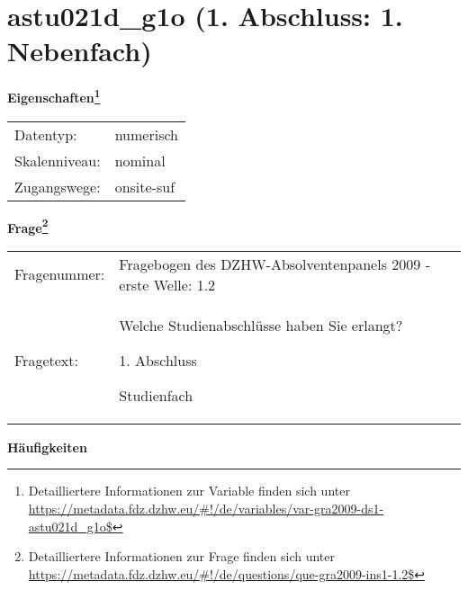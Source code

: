 
    \setcounter{footnote}{0}

    \vspace*{-1.8cm}
	\section{astu021d\_g1o (1. Abschluss: 1. Nebenfach)}
	\label{section:astu021d_g1o}



    \vspace*{0.5cm}
    \noindent\textbf{Eigenschaften\footnote{Detailliertere Informationen zur Variable finden sich unter
		\url{https://metadata.fdz.dzhw.eu/\#!/de/variables/var-gra2009-ds1-astu021d_g1o$}}}\\
	\begin{tabularx}{\hsize}{@{}lX}
	Datentyp: & numerisch \\
	Skalenniveau: & nominal \\
	Zugangswege: &
	  onsite-suf
 \\
    \end{tabularx}



				\vspace*{0.5cm}
                \noindent\textbf{Frage\footnote{Detailliertere Informationen zur Frage finden sich unter
		              \url{https://metadata.fdz.dzhw.eu/\#!/de/questions/que-gra2009-ins1-1.2$}}}\\
				\begin{tabularx}{\hsize}{@{}lX}
					Fragenummer: &
					  Fragebogen des DZHW-Absolventenpanels 2009 - erste Welle:
					  1.2
 \\
					Fragetext: & Welche Studienabschlüsse haben Sie erlangt?\par  1. Abschluss\par  Studienfach \\
				\end{tabularx}





        		\vspace*{0.5cm}
                \noindent\textbf{Häufigkeiten}

